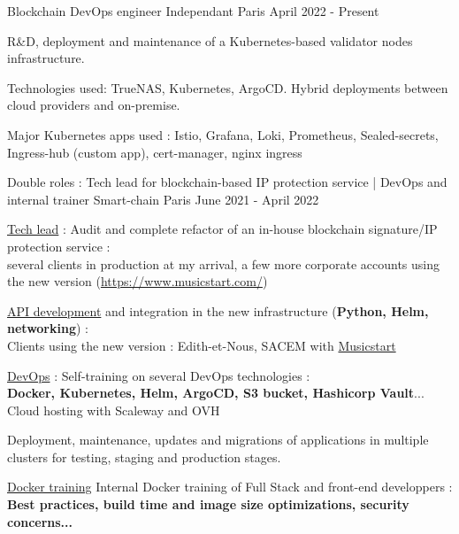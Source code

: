 
\begin{cventries}
  \cventry
    {Blockchain DevOps engineer} %
    {Independant} %
    {Paris} %
    {April 2022 - Present} %
    {
      \begin{cvitems} %
      {
        \item {R\&D, deployment and maintenance of a Kubernetes-based validator nodes infrastructure.}
        \item {Technologies used: TrueNAS, Kubernetes, ArgoCD. Hybrid deployments between cloud providers and on-premise.}
        \item {Major Kubernetes apps used : Istio, Grafana, Loki, Prometheus, Sealed-secrets, Ingress-hub (custom app), cert-manager, nginx ingress}
      }
      \end{cvitems}
    }
    \cventry
      {Double roles : Tech lead for blockchain-based IP protection service | DevOps and internal trainer} %
      {Smart-chain} %
      {Paris} %
      {June 2021 - April 2022} %
      {
        \begin{cvitems} %
        {
          \item {\underline{Tech lead} : Audit and complete refactor of an in-house blockchain signature/IP protection service :\\several clients in production at my arrival, a few more corporate accounts using the new version (\href{https://www.musicstart.com/}{https://www.musicstart.com/})}
          \item {\underline{API development} and integration in the new infrastructure (\textbf{Python, Helm, networking}) :\\Clients using the new version : Edith-et-Nous, SACEM with \href{https://www.musicstart.com/}{Musicstart}}
          \item {\underline{DevOps} : Self-training on several DevOps technologies :\\\textbf{Docker, Kubernetes, Helm, ArgoCD, S3 bucket, Hashicorp Vault}... Cloud hosting with Scaleway and OVH}
          \item {Deployment, maintenance, updates and migrations of applications in multiple clusters for testing, staging and production stages.}
          \item {\underline{Docker training} Internal Docker training of Full Stack and front-end developpers : \textbf{Best practices, build time and image size optimizations, security concerns...}}
        }
        \end{cvitems}
      }


\end{cventries}
